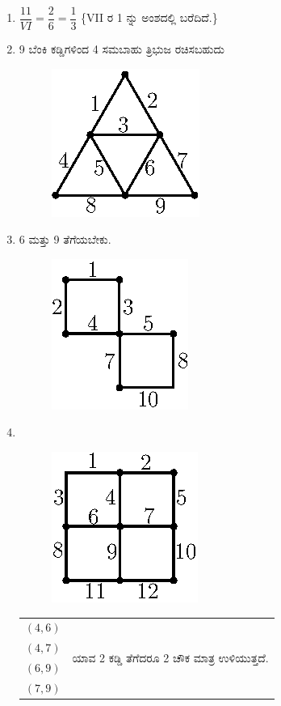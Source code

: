 \begin{enumerate}
\smallskip
\item $\dfrac{11}{VI} = \dfrac{2}{6} = \dfrac{1}{3}$ \{VII ರ 1 ನ್ನು ಅಂಶದಲ್ಲಿ ಬರೆದಿದೆ.\}

\smallskip
\item 9 ಬೆಂಕಿ ಕಡ್ಡಿಗಳಿಂದ 4 ಸಮಬಾಹು ತ್ರಿಭುಜ ರಚಿಸಬಹುದು 
\begin{figure}[H]
\centering
\includegraphics{images/chap1/ans9.eps}
\end{figure}

\eject

\item 6 ಮತ್ತು 9 ತೆಗೆಯಬೇಕು. 
\begin{figure}[H]
\centering
\includegraphics{images/chap1/ans10.eps}
\end{figure}

\item 
~

\begin{minipage}[c]{5cm}
\begin{figure}[H]
\centering
\includegraphics{images/chap1/ans11.eps}
\end{figure}
\end{minipage}
\begin{minipage}[c]{5cm}
\begin{tabular}{cc}
$(4,6)$ & \multirow{4}{3cm}{ಯಾವ 2 ಕಡ್ಡಿ ತೆಗೆದರೂ 2 ಚೌಕ ಮಾತ್ರ ಉಳಿಯುತ್ತದೆ.}\\
$(4,7)$ & \\
$(6,9)$ &\\
$(7,9)$ & 
\end{tabular}
\end{minipage}



\end{enumerate}
